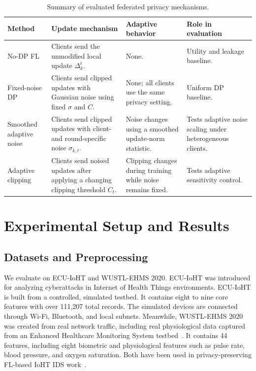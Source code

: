 \documentclass[conference]{IEEEtran}
\begin{document}
\begin{table}[!t]
\centering
\caption{Summary of evaluated federated privacy mechanisms.}
\label{tab:method_summary}
\renewcommand{\arraystretch}{1.15}
\footnotesize
\begin{tabular}{p{} p{} p{}
p{}}
\toprule
\textbf{Method} & \textbf{Update mechanism} & \textbf{Adaptive behavior} &
\textbf{Role in evaluation} \\
\midrule

No-DP FL & Clients send the unmodified local update \(\Delta_k^t\). & None. &
Utility and leakage baseline. \\

Fixed-noise DP & Clients send clipped updates with Gaussian noise using fixed
\(\sigma\) and \(C\). & None; all clients use the same privacy setting. &
Uniform DP baseline. \\

Smoothed adaptive noise & Clients send clipped updates with client- and
round-specific noise \(\sigma_{k,t}\). & Noise changes using a smoothed
update-norm statistic. & Tests adaptive noise scaling under heterogeneous
clients. \\

Adaptive clipping & Clients send noised updates after applying a changing
clipping threshold \(C_t\). & Clipping changes during training while noise
remains fixed. & Tests adaptive sensitivity control. \\

\bottomrule
\end{tabular}
\end{table}





\section{Experimental Setup and Results}

\subsection{Datasets and Preprocessing}

We evaluate on ECU-IoHT and WUSTL-EHMS 2020. ECU-IoHT was introduced for
analyzing cyberattacks in Internet of Health Things environments. ECU-IoHT is
built from a controlled, simulated testbed. It contains eight to nine core
features with over 111,207 total records. The simulated devices are connected
through Wi-Fi, Bluetooth, and local subnets. Meanwhile, WUSTL-EHMS 2020 was
created from real network traffic, including real physiological data captured
from an Enhanced Healthcare Monitoring System
testbed~\cite{ahmed2021ecuiot,wustl2020ehms}. It contains 44 features, including
eight biometric and physiological features such as pulse rate, blood pressure,
and oxygen saturation. Both have been used in privacy-preserving FL-based IoHT
IDS work~\cite{mosaiyebzadeh2025secioht}.
\end{document}
